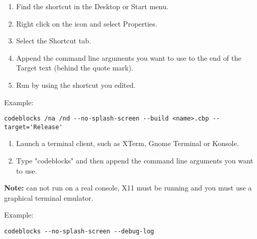 \begin{enumerate}[noitemsep] 
\item Find the \codeblocks shortcut in the Desktop or Start menu.
\item Right click on the icon and select Properties.
\item Select the Shortcut tab.
\item Append the command line arguments you want to use to the end of the Target text (behind the quote mark).
\item Run \codeblocks by using the shortcut you edited.
\end{enumerate}

Example:
\begin{lstlisting}
codeblocks /na /nd --no-splash-screen --build <name>.cbp --target='Release'
\end{lstlisting}

\begin{enumerate}[noitemsep]
\item Launch a terminal client, such as XTerm, Gnome Terminal or Konsole.
\item Type "codeblocks" and then append the command line arguments you want to use.
\end{enumerate}
\textbf{Note:} \codeblocks can not run on a real console, X11 must be running and you must use a graphical terminal emulator.

Example:
\begin{lstlisting}
codeblocks --no-splash-screen --debug-log
\end{lstlisting}


